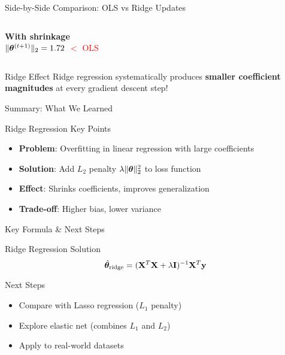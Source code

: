 \documentclass{beamer}
\begin{document}
\begin{frame}{Side-by-Side Comparison: OLS vs Ridge Updates}
\begin{columns}
\begin{center}

\textbf{With shrinkage} \\
$\|\boldsymbol{\theta}^{(t+1)}\|_2 = 1.72$ \textcolor{red}{$<$ OLS}
\end{center}
\end{columns}

\begin{alertbox}{Ridge Effect}
Ridge regression systematically produces \textbf{smaller coefficient magnitudes} at every gradient descent step!
\end{alertbox}
\end{frame}

\begin{frame}{Summary: What We Learned}
\begin{keypointsbox}{Ridge Regression Key Points}
\begin{itemize}
\item \textbf{Problem}: Overfitting in linear regression with large coefficients
\item \textbf{Solution}: Add $L_2$ penalty $\lambda\|\boldsymbol{\theta}\|_2^2$ to loss function
\item \textbf{Effect}: Shrinks coefficients, improves generalization
\item \textbf{Trade-off}: Higher bias, lower variance
\end{itemize}
\end{keypointsbox}
\end{frame}

\begin{frame}{Key Formula \& Next Steps}
\begin{theorembox}{Ridge Regression Solution}
$$\hat{\boldsymbol{\theta}}_{\text{ridge}} = (\mathbf{X}^T\mathbf{X} + \lambda\mathbf{I})^{-1}\mathbf{X}^T\mathbf{y}$$
\end{theorembox}
\pause

\begin{alertbox}{Next Steps}
\begin{itemize}
\item Compare with Lasso regression ($L_1$ penalty)
\item Explore elastic net (combines $L_1$ and $L_2$)
\item Apply to real-world datasets
\end{itemize}
\end{alertbox}
\end{frame}
\end{document}
